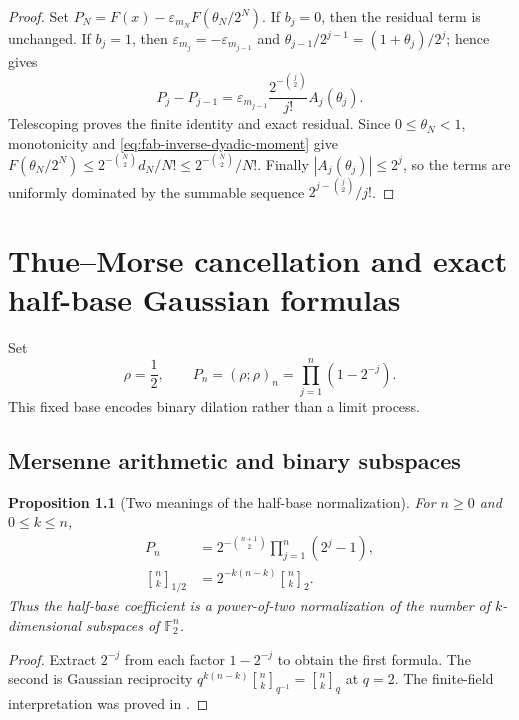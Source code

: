 \documentclass[11pt,oneside,openany]{book}
\newtheorem{proposition}[theorem]{Proposition}
\theoremstyle{definition}
\theoremstyle{remark}
\newcommand{\Qbinom}[3]{\genfrac{[}{]}{0pt}{}{#1}{#2}_{#3}}
\newcommand{\F}{\mathbb F}
\begin{document}
\begin{proof}
Set $P_N=F(x)-\varepsilon_{m_N}F(\theta_N/2^N)$.  If $b_j=0$, then the
residual term is unchanged.  If $b_j=1$, then
$\varepsilon_{m_j}=-\varepsilon_{m_{j-1}}$ and
$\theta_{j-1}/2^{j-1}=(1+\theta_j)/2^j$; hence
 gives
\[
 P_j-P_{j-1}=\varepsilon_{m_{j-1}}
 \frac{2^{-\binom j2}}{j!}A_j(\theta_j).
\]
Telescoping proves the finite identity and exact residual.  Since
$0\le\theta_N<1$, monotonicity and
\eqref{eq:fab-inverse-dyadic-moment} give
$F(\theta_N/2^N)\le2^{-\binom N2}d_N/N!\le2^{-\binom N2}/N!$.
Finally $|A_j(\theta_j)|\le2^j$, so the terms are uniformly dominated by the
summable sequence $2^{j-\binom j2}/j!$.
\end{proof}

\chapter{Thue--Morse cancellation and exact half-base Gaussian formulas}
\label{chap:fabius-q-half}

Set
\begin{equation}
 \rho=\frac12,
 \qquad
 P_n=(\rho;\rho)_n=\prod_{j=1}^{n}(1-2^{-j}).
 \label{eq:fq-rho-P}
\end{equation}
This fixed base encodes binary dilation rather than a limit process.

\section{Mersenne arithmetic and binary subspaces}

\begin{proposition}[Two meanings of the half-base normalization]
\label{prop:fq-half-arithmetic}
For $n\ge0$ and $0\le k\le n$,
\begin{align}
 P_n&=2^{-\binom{n+1}{2}}\prod_{j=1}^{n}(2^j-1),
 \label{eq:fq-P-Mersenne}\\
 \Qbinom nk{1/2}&=2^{-k(n-k)}\Qbinom nk2.
 \label{eq:fq-half-vs-two}
\end{align}
Thus the half-base coefficient is a power-of-two normalization of the number
of $k$-dimensional subspaces of $\F_2^n$.
\end{proposition}

\begin{proof}
Extract $2^{-j}$ from each factor $1-2^{-j}$ to obtain the first formula.
The second is Gaussian reciprocity
$q^{k(n-k)}\Qbinom nk{q^{-1}}=\Qbinom nkq$ at $q=2$.
The finite-field interpretation was proved in .
\end{proof}
\end{document}
